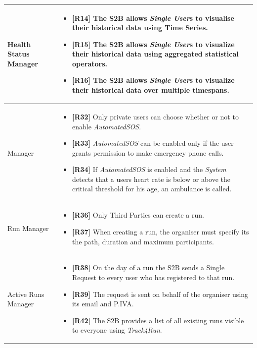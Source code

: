 \documentclass[titlepage]{article}
\begin{document}
\begin{longtable}{| p{5 cm} | p{8 cm} |}
		\\	 \hline	
		\newline Health Status Manager & 
		\begin{itemize}
			\item {\bf [R14]} The S2B allows {\it Single User}s to visualise their historical data using Time Series. 
			\item {\bf [R15]} The S2B allows {\it Single User}s to visualize their historical data using aggregated statistical operators. 
			\item {\bf [R16]} The S2B allows {\it Single User}s to visualize their historical data over multiple timespans.
		\end{itemize}		
		\\	 \hline
		\newline {\it AutomatedSOS} Manager & 
		\begin{itemize}
			\item {\bf [R32]} Only private users can choose whether or not to enable {\it AutomatedSOS}. 
			\item {\bf [R33]} {\it AutomatedSOS} can be enabled only if the user grants permission to make emergency phone calls. 
			\item {\bf [R34]} If {\it AutomatedSOS} is enabled and the {\it System} detects that a user\textsc{\char13}s heart rate is below or above the critical threshold for his age, an ambulance is called. 
		\end{itemize}		
		\\	 \hline
		\newline Run Manager & 
		\begin{itemize}
			\item {\bf [R36]} Only Third Parties can create a run.
			\item {\bf [R37]} When creating a run, the organiser must specify its the path, duration and maximum participants.
		\end{itemize}		
		\\	 \hline	
		\newline Active Runs Manager & 
		\begin{itemize}
			\item {\bf [R38]} On the day of a run the S2B sends a Single Request to every user who has registered to that run.
			\item {\bf [R39]} The request is sent on behalf of the organiser using its email and P.IVA.
			\item {\bf [R42]} The S2B provides a list of all existing runs visible to everyone using {\it Track4Run}.

\end{itemize}
\end{longtable}
\end{document}
